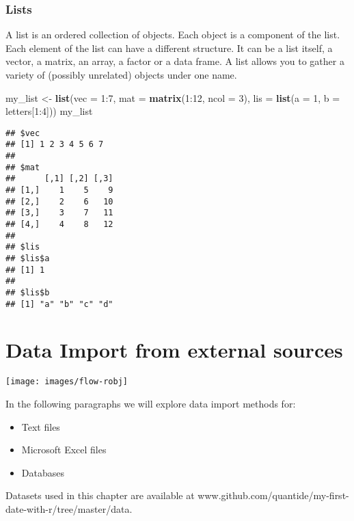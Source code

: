\documentclass[]{book}
\newenvironment{Shaded}{\begin{snugshade}}{\end{snugshade}}
\newcommand{\KeywordTok}[1]{\textcolor[rgb]{0.13,0.29,0.53}{\textbf{{#1}}}}
\newcommand{\DataTypeTok}[1]{\textcolor[rgb]{0.13,0.29,0.53}{{#1}}}
\newcommand{\DecValTok}[1]{\textcolor[rgb]{0.00,0.00,0.81}{{#1}}}
\newcommand{\StringTok}[1]{\textcolor[rgb]{0.31,0.60,0.02}{{#1}}}
\newcommand{\NormalTok}[1]{{#1}}
\providecommand{\tightlist}{%
  \setlength{\itemsep}{0pt}\setlength{\parskip}{0pt}}
\def\tightlist{}
\begin{document}
\subsection{Lists}\label{lists}

A list is an ordered collection of objects. Each object is a component
of the list. Each element of the list can have a different structure. It
can be a list itself, a vector, a matrix, an array, a factor or a data
frame. A list allows you to gather a variety of (possibly unrelated)
objects under one name.

\begin{Shaded}
\begin{Highlighting}[]
\NormalTok{my_list <-}\StringTok{ }\KeywordTok{list}\NormalTok{(}\DataTypeTok{vec =} \DecValTok{1}\NormalTok{:}\DecValTok{7}\NormalTok{, }\DataTypeTok{mat =} \KeywordTok{matrix}\NormalTok{(}\DecValTok{1}\NormalTok{:}\DecValTok{12}\NormalTok{, }\DataTypeTok{ncol =} \DecValTok{3}\NormalTok{),}
  \DataTypeTok{lis =} \KeywordTok{list}\NormalTok{(}\DataTypeTok{a =} \DecValTok{1}\NormalTok{, }\DataTypeTok{b =} \NormalTok{letters[}\DecValTok{1}\NormalTok{:}\DecValTok{4}\NormalTok{]))}
\NormalTok{my_list}
\end{Highlighting}
\end{Shaded}

\begin{verbatim}
## $vec
## [1] 1 2 3 4 5 6 7
## 
## $mat
##      [,1] [,2] [,3]
## [1,]    1    5    9
## [2,]    2    6   10
## [3,]    3    7   11
## [4,]    4    8   12
## 
## $lis
## $lis$a
## [1] 1
## 
## $lis$b
## [1] "a" "b" "c" "d"
\end{verbatim}

\chapter{Data Import from external
sources}\label{data-import-from-external-sources}

\texttt{[image: images/flow-robj]}

In the following paragraphs we will explore data import methods for:

\begin{itemize}
\tightlist
\item
  Text files
\item
  Microsoft Excel files
\item
  Databases
\end{itemize}

Datasets used in this chapter are available at
www.github.com/quantide/my-first-date-with-r/tree/master/data.
\end{document}
